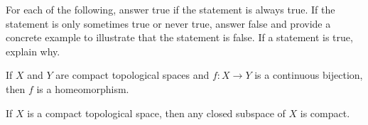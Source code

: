 \begin{comment}

\ExerciseSolution

\ba

\item Let $x \in \R^n$. Then $x \in B(x,1)$. Since $\overline{B(x,1)}$ is closed and bounded, the Henie-Borel Theorem tells us that $\overline{B(x,1)}$ is compact. Thus, $\R^n$ is locally compact. 

\item Suppose $X$ is a compact space and let $x \in X$. Then $x \in X = \overline{X}$ where $\overline{X}$ is compact. So $X$ is locally compact. 

\item Let $X$ denote the Sorgenfrey line. Let $x$ and $y$ be distinct points in $X$. Without loss of generality, assume $x < y$.  Let $U = [x-d, x+d)$ and $V = [y-d, y+d)$ where $d = \frac{|x - y|}{2}$. Then $x \in U$ and $y \in V$ and $U \cap V = \emptyset$. So $X$ is Hausdorff.

To show that $X$ is not locally compact, consider $0 \in X$. Let $O$ be an open subset of $X$ such that $0 \in O$ and $\overline{O}$ is compact. Since $O$ is open, there is a basis element $B = [a,b)$ that is a subset of $O$ that contains $0$. But then $[0,b)$ is a subset of $O$. Note that $X \setminus [0, b) = (-\infty, 0) \cup [b, \infty)$ is open in $X$, so $[0,b)$ is closed in $X$. Thus $[0,b)$ is a closed subset of the compact space $\overline{O}$, and so $[0,b)$ is compact. Let $n \in \Z^+$ such that $ \frac{1}{n} < b$. Then $\{\left[0, b - \frac{1}{k}\right)\}_{k \geq n}$ is an open cover of $[0,b)$ with no finite subcover. This is a contradiction and so $X$ must not be locally compact. 

\ea

\end{comment}



\item For each of the following, answer true if the statement is always true. If the statement is only sometimes true or never true, answer false and provide a concrete example to illustrate that the statement is false. If a statement is true, explain why. 
	\ba
	\item  If $X$ and $Y$ are compact topological spaces and $f: X \to Y$ is a continuous bijection, then $f$ is a homeomorphism.
	
	\item If $X$ is a compact topological space, then any closed subspace of $X$ is compact. 

